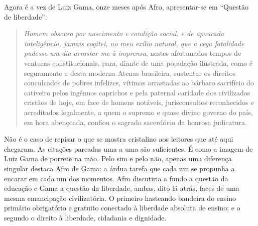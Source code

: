 Agora é a vez de Luiz Gama, onze meses após Afro, apresentar-se
em ``Questão de liberdade'':

\begin{quote}
\textit{Homem obscuro por nascimento e condição social, e de apoucada
inteligência, jamais cogitei, no meu exílio natural, que a cega
fatalidade pudesse um dia arrastar-me à imprensa}, nestes afortunados
tempos de venturas constitucionais, para, diante de uma população
ilustrada, como é seguramente a desta moderna Atenas brasileira,
sustentar os direitos conculcados de pobres infelizes, vítimas
arrastadas ao bárbaro sacrifício do cativeiro pelos ingênuos caprichos e
pela paternal caridade dos civilizados cristãos de hoje, em face de
homens notáveis, jurisconsultos reconhecidos e acreditados legalmente, a
quem o supremo e quase divino governo do país, em hora abençoada,
confiou o sagrado sacerdócio da honrosa judicatura.
\end{quote}

Não é o caso de repisar o que se mostra cristalino aos leitores que até
aqui chegaram. As citações pareadas uma a uma são suficientes. É como a
imagem de Luiz Gama de porrete na mão. Pelo sim e pelo não, apenas uma
diferença singular destaca Afro de Gama: a árdua tarefa que cada
um se propunha a encarar em cada um dos momentos. Afro discutiria
a fundo a questão da educação e Gama a questão da liberdade, ambas, dito
lá atrás, faces de uma mesma emancipação civilizatória. O primeiro
hasteando bandeira do ensino primário obrigatório e gratuito conectado à
liberdade absoluta de ensino; e o segundo o direito à liberdade,
cidadania e dignidade.

